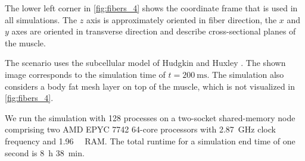 The lower left corner in \cref{fig:fibers_4} shows the coordinate frame that is used in all simulations. The $z$ axis is approximately  oriented in fiber direction, the $x$ and $y$ axes are oriented in transverse direction and describe cross-sectional planes of the muscle.

The scenario uses the subcellular model of Hudgkin and Huxley \cite{Hodgkin1952}. The shown image corresponds to the simulation time of $t=\SI{200}{\milli\second}$. The simulation also considers a body fat mesh layer on top of the muscle, which is not visualized in \cref{fig:fibers_4}.

We run the simulation with 128 processes on a two-socket shared-memory node comprising two AMD EPYC 7742 64-core processors with \SI{2.87}{\giga\hertz} clock frequency and \SI{1.96}{\tebi\byte} RAM. The total runtime for a simulation end time of one second is \SI{8}{\hour} \SI{38}{\minute}.

